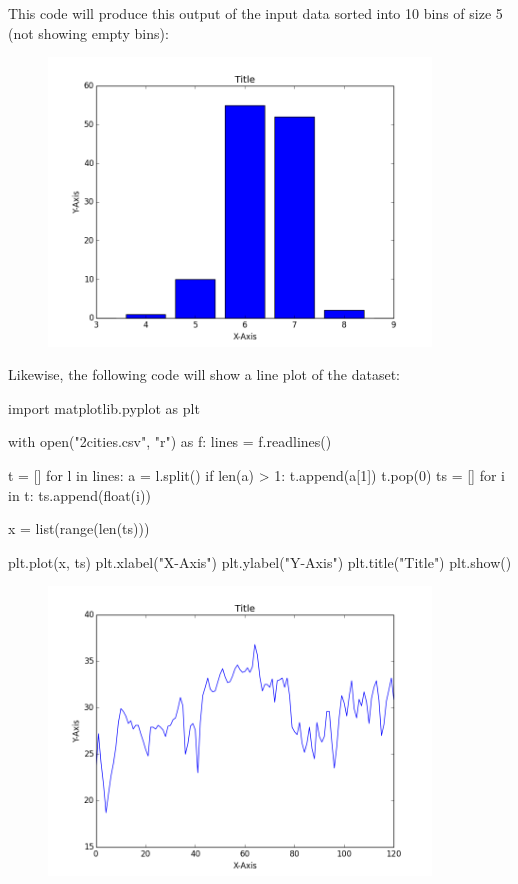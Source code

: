 \documentclass[11pt]{cselabheader}
\begin{document}
This code will produce this output of the input data sorted into 10 bins of size 5 (not showing empty bins):\\
\begin{figure}[h]
  \centering
  \includegraphics[width=4.0in]{img/bar1}
\end{figure}

Likewise, the following code will show a line plot of the dataset:\\
\begin{python3code}
import matplotlib.pyplot as plt

with open("2cities.csv", "r") as f:
        lines = f.readlines()

t = []
for l in lines:
        a = l.split()
        if len(a) > 1:
                t.append(a[1])
t.pop(0)
ts = []
for i in t:
        ts.append(float(i))

x = list(range(len(ts)))

plt.plot(x, ts)
plt.xlabel("X-Axis")
plt.ylabel("Y-Axis")
plt.title("Title")
plt.show()
\end{python3code}

\begin{figure}[h]
  \centering
  \includegraphics[width=4.0in]{img/line1}
\end{figure}
\end{document}
